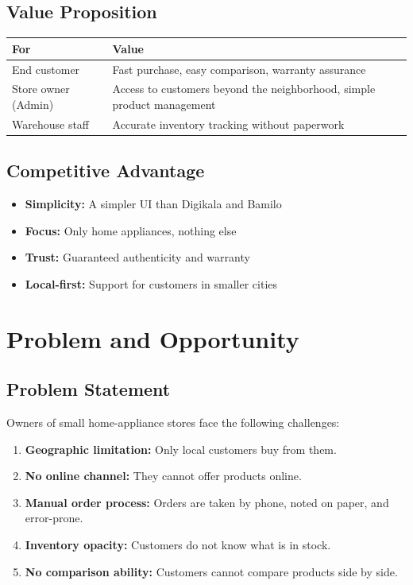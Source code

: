 \documentclass[12pt, a4paper]{article}
\begin{document}
\subsection{Value Proposition}
\begin{center}
\begin{tabular}{|l|p{8cm}|}
\hline
\textbf{For} & \textbf{Value} \\
\hline
End customer & Fast purchase, easy comparison, warranty assurance \\
\hline
Store owner (Admin) & Access to customers beyond the neighborhood, simple product management \\
\hline
Warehouse staff & Accurate inventory tracking without paperwork \\
\hline
\end{tabular}
\end{center}

\subsection{Competitive Advantage}
\begin{itemize}
    \item \textbf{Simplicity:} A simpler UI than Digikala and Bamilo
    \item \textbf{Focus:} Only home appliances, nothing else
    \item \textbf{Trust:} Guaranteed authenticity and warranty
    \item \textbf{Local-first:} Support for customers in smaller cities
\end{itemize}

\section{Problem and Opportunity}

\subsection{Problem Statement}
Owners of small home-appliance stores face the following challenges:
\begin{enumerate}
    \item \textbf{Geographic limitation:} Only local customers buy from them.
    \item \textbf{No online channel:} They cannot offer products online.
    \item \textbf{Manual order process:} Orders are taken by phone, noted on paper, and error-prone.
    \item \textbf{Inventory opacity:} Customers do not know what is in stock.
    \item \textbf{No comparison ability:} Customers cannot compare products side by side.
\end{enumerate}
\end{document}
